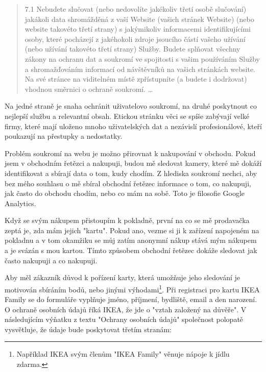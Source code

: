 \documentclass[bc,male,java,dept456]{diploma}						%
\begin{document}
\begin{quote}
7.1 Nebudete slučovat (nebo nedovolíte jakékoliv třetí osobě slučování) jakákoli data shromážděná z vaší Website (vašich stránek Website) (nebo website ta\-ko\-vé\-to třetí strany) s jakýmikoliv informacemi identifikujícími osoby, které pocházejí z jakéhokoli zdroje jsoucího částí vašeho užívání (nebo užívání takovéto třetí strany) Služby. Budete splňovat všechny zákony na ochranu dat a soukromí ve spojitosti s vašim používáním Služby a shromažďováním informací od návštěvníků na vašich stránkách website. Na své stránce na viditelném místě zpřístupníte (a budete i dodržovat) vhodnou směrnici o ochraně soukromí.
\ldots
\end{quote}

Na jedné straně je snaha ochránit uživatelovo soukromí, na druhé poskytnout co nejlepší službu a relevantní obsah. Etickou stránku věci se spíše zabývají velké firmy, které mají uloženo mnoho uživatelských dat a nezávislí profesionálové, kteří poukazují na přestupky a nedostatky.

Problém soukromí na webu je možno přirovnat k nakupování v obchodu. Pokud jsem v obchodním řetězci a nakupuji, budou mě sledovat kamery, které mě dokáží identifikovat a sbírají data o tom, kudy chodím. Z hlediska soukromí nechci, aby bez mého souhlasu o mě sbíral obchodní řetězec informace o tom, co nakupuji, jak často do obchodu chodím, nebo co mám na sobě. Toto je filosofie Google Analytics.

Když se svým nákupem přistoupím k pokladně, první na co se mě prodavačka zeptá je, zda mám jejich "kartu". Pokud ano, vezme si ji k zařízení napojeném na pokladnu a v tom okamžiku se můj zatím anonymní nákup stává mým nákupem a je svázán s mou kartou. Tímto způsobem obchodní řetězec dokáže sledovat jak často nakupuji a co nakupuji.

Aby měl zákazník důvod k pořízení karty, která umožňuje jeho sledování je motivován sbíráním bodů, nebo jinými výhodami\footnote{Například IKEA svým členům "IKEA Family" věnuje nápoje k jídlu zdarma.}. Při registraci pro kartu IKEA Family se do formuláře vyplňuje jméno, příjmení, bydliště, email a den narození. O ochraně osobních údajů říká IKEA, že jde o "vztah založený na důvěře". V následujícím výňatku z textu "Ochrany osobních údajů" společnost polopatě vysvětluje, že údaje bude poskytovat třetím stranám:
\end{document}
